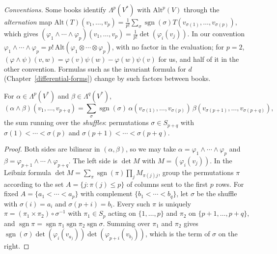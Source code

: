 \begin{example}
\emph{Conventions.} Some books identify $\Lambda^p(V^*)$ with $\mathrm{Alt}^p(V)$ through the \emph{alternation} map $\mathrm{Alt}(T)(v_1, \ldots, v_p) = \frac1{p!}\sum_\sigma\operatorname{sgn}(\sigma)T(v_{\sigma(1)}, \ldots, v_{\sigma(p)})$,
which gives $(\varphi_1 \wedge \cdots \wedge \varphi_p)(v_1, \ldots, v_p) = \frac1{p!}\det(\varphi_i(v_j))$. In our convention $\varphi_1 \wedge \cdots \wedge \varphi_p = p!\,\mathrm{Alt}(\varphi_1 \otimes \cdots \otimes \varphi_p)$,
with no factor in the evaluation; for $p = 2$, $(\varphi \wedge \psi)(v, w) = \varphi(v)\psi(w) - \varphi(w)\psi(v)$ for us, and half of it in the other convention. Formulas such as the invariant formula for $d$
(Chapter~\ref{differential-forms}) change by such factors between books.
\end{example}

\begin{proposition}\label{multilinear-algebra:proposition-wedge-formula}
For $\alpha \in \Lambda^p(V^*)$ and $\beta \in \Lambda^q(V^*)$,
\[
(\alpha \wedge \beta)(v_1, \ldots, v_{p+q}) = \sum_{\sigma} \operatorname{sgn}(\sigma)\, \alpha(v_{\sigma(1)}, \ldots, v_{\sigma(p)})\,
\beta(v_{\sigma(p+1)}, \ldots, v_{\sigma(p+q)}),
\]
the sum running over the \emph{shuffles}: permutations $\sigma \in S_{p+q}$ with $\sigma(1) < \cdots < \sigma(p)$ and
$\sigma(p+1) < \cdots < \sigma(p+q)$.
\end{proposition}

\begin{proof}
Both sides are bilinear in $(\alpha, \beta)$, so we may take $\alpha = \varphi_1 \wedge \cdots \wedge \varphi_p$ and
$\beta = \varphi_{p+1} \wedge \cdots \wedge \varphi_{p+q}$. The left side is $\det M$ with $M = (\varphi_i(v_j))$. In the Leibniz
formula $\det M = \sum_\pi \operatorname{sgn}(\pi)\prod_j M_{\pi(j) j}$, group the permutations $\pi$ according to the set
$A = \{j : \pi(j) \leq p\}$ of columns sent to the first $p$ rows. For fixed $A = \{a_1 < \cdots < a_p\}$ with complement
$\{b_1 < \cdots < b_q\}$, let $\sigma$ be the shuffle with $\sigma(i) = a_i$ and $\sigma(p + i) = b_i$. Every such $\pi$ is
uniquely $\pi = (\pi_1 \times \pi_2) \circ \sigma^{-1}$ with $\pi_1 \in S_p$ acting on $\{1, \ldots, p\}$ and $\pi_2$ on
$\{p+1, \ldots, p+q\}$, and $\operatorname{sgn}\pi = \operatorname{sgn}\pi_1 \operatorname{sgn}\pi_2 \operatorname{sgn}\sigma$. Summing over $\pi_1$ and $\pi_2$
gives $\operatorname{sgn}(\sigma)\det(\varphi_i(v_{a_j}))\det(\varphi_{p+i}(v_{b_j}))$, which is the term of $\sigma$ on the right.
\end{proof}

